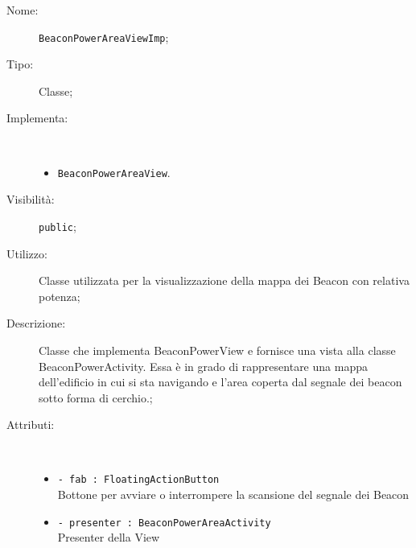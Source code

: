 \documentclass[../DefinizioneDiProdotto.tex]{subfiles}
\begin{document}
\begin{description}
	\item[Nome:] \texttt{BeaconPowerAreaViewImp};
	\item[Tipo:] Classe;
	\item[Implementa:] \
	\begin{itemize}
		\item \texttt{BeaconPowerAreaView}.
		
	\end{itemize}
	\item[Visibilità:] \texttt{public};
	\item[Utilizzo:] Classe utilizzata per la visualizzazione della mappa dei Beacon con relativa potenza;
	\item[Descrizione:] Classe che implementa BeaconPowerView e fornisce una vista alla classe BeaconPowerActivity. Essa è in grado di rappresentare una mappa dell'edificio in cui si sta navigando e l'area coperta dal segnale dei beacon sotto forma di cerchio.;
	\item[Attributi:] \
	\begin{itemize}
		\item \texttt{- fab : FloatingActionButton}\\
		Bottone per avviare o interrompere la scansione del segnale dei Beacon
		
		\item \texttt{- presenter : BeaconPowerAreaActivity}\\
		Presenter della View
		

\end{itemize}
\end{description}
\end{document}
